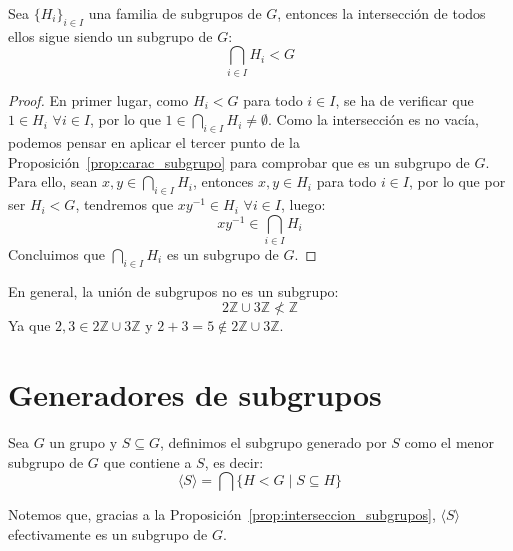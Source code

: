 \begin{prop}\label{prop:interseccion_subgrupos}
    Sea $\{H_i\}_{i \in I}$ una familia de subgrupos de $G$, entonces la intersección de todos ellos sigue siendo un subgrupo de $G$:
    \begin{equation*}
        \bigcap_{i \in I} H_i < G
    \end{equation*}
    \begin{proof}
        En primer lugar, como $H_i < G$ para todo $i \in I$, se ha de verificar que $1\in H_i$ $\forall i \in I$, por lo que $1\in \bigcap\limits_{i \in I} H_i \neq \emptyset $. Como la intersección es no vacía, podemos pensar en aplicar el tercer punto de la Proposición~\ref{prop:carac_subgrupo} para comprobar que es un subgrupo de $G$.\\

        \noindent
        Para ello, sean $x,y\in \bigcap\limits_{i \in I}H_i$, entonces $x,y\in H_i$ para todo $i \in I$, por lo que por ser $H_i < G$, tendremos que $xy^{-1}\in H_i$ $\forall i \in I$, luego:
        \begin{equation*}
            xy^{-1} \in \bigcap_{i \in I}H_i
        \end{equation*}
        Concluimos que $\bigcap\limits_{i \in I}H_i$ es un subgrupo de $G$.
    \end{proof}
\end{prop}

\begin{ejemplo}
    En general, la unión de subgrupos no es un subgrupo:
    \begin{equation*}
        2\mathbb{Z} \cup 3\mathbb{Z}  \not< \mathbb{Z}
    \end{equation*}
    Ya que $2,3\in 2\mathbb{Z}\cup 3\mathbb{Z}$ y $2+3 = 5\notin 2\mathbb{Z}\cup 3\mathbb{Z}$.
\end{ejemplo}

\section{Generadores de subgrupos}
\begin{definicion}
    Sea $G$ un grupo y $S\subseteq G$, definimos el subgrupo generado por $S$ como el menor subgrupo de $G$ que contiene a $S$, es decir:
    \begin{equation*}
        \langle S \rangle  = \bigcap \{H < G \mid S\subseteq H\}
    \end{equation*}
\end{definicion}
\begin{observacion}
    Notemos que, gracias a la Proposición~\ref{prop:interseccion_subgrupos}, $\langle S \rangle $ efectivamente es un subgrupo de $G$.
\end{observacion}

